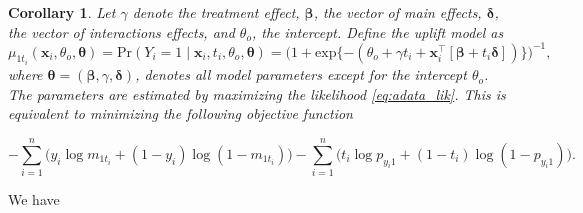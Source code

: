 \documentclass{article}
\def\x{\mathbf x}
\newtheorem{corollary}[theorem]{Corollary}
\begin{document}
\begin{corollary}
Let $\gamma$ denote the treatment effect, $\boldsymbol{\beta}$, the vector of main effects, $\boldsymbol{\delta}$, the vector of interactions effects, and $\theta_o$, the intercept. 
Define the uplift model as 
\begin{equation}
  \mu_{1t_i}(\x_i, \theta_o, \boldsymbol{\theta}) = \mathrm{Pr} (Y_i = 1 \mid \mathbf{x}_i, t_i, \theta_o, \boldsymbol{\theta}) =
  \bigl( 1+ \mathrm{exp}\{-(\theta_o + \gamma t_i + \mathbf{x}_i^\top [\boldsymbol{\beta} + t_i \boldsymbol{\delta}] ) \} \bigr)^{-1},
\label{eq:pitheta}
\end{equation}
where $\boldsymbol{\theta} = (\boldsymbol{\beta}, \gamma, \boldsymbol{\delta})$, denotes all model parameters except for the intercept $\theta_o$. The parameters are estimated by maximizing the likelihood \eqref{eq:adata_lik}. This is equivalent to minimizing the following objective function

\begin{equation}
    - \sum_{i=1}^n \Big(y_i \log m_{ 1 t_i} + (1 - y_i)\log(1 - m_{1 t_i }) \Big) - \sum_{i=1}^n \Big(t_i \log p_{y_i 1} + (1 - t_i)\log(1 - p_{y_i 1})  \Big).
    \label{eq:IE_neg_likelihood}
\end{equation}



\end{corollary}



We have
\end{document}

